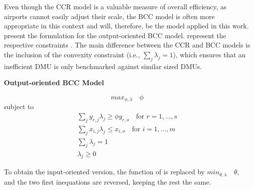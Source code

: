 Even though the CCR model is a valuable measure of overall efficiency, as airports cannot easily adjust their scale, the BCC model is often more appropriate in this context and will, therefore, be the model applied in this work.  present the formulation for the output-oriented BCC model.  represent the respective constraints . The main difference between the CCR and BCC models is the inclusion of the convexity constraint (i.e., \(\sum_j \lambda_j = 1\)), which ensures that an inefficient DMU is only benchmarked against similar sized DMUs. 


\vspace{0.5cm}
\begin{center}
\textbf{Output-oriented BCC Model}
\end{center}
\begin{equation}
    \label{output_dea}
max_{\phi,\lambda} \quad \phi
\end{equation}
subject to
\begin{equation}
\label{eq:bcc_constraints_output}
\begin{gathered}
\sum_j y_{r,j} \lambda_j \geq \phi y_{r,o} \quad \text{for } r=1,\ldots,s \\
\sum_j x_{i,j}\lambda_j \leq x_{i,o} \quad \text{for } i=1,\ldots,m \\
\sum_j \lambda_j = 1 \\
\lambda_j \geq 0
\end{gathered}
\end{equation}

To obtain the input-oriented version, the function of  is replaced by \(min_{\theta,\lambda} \quad \theta\), and the two first inequations are reversed, keeping the rest the same.

